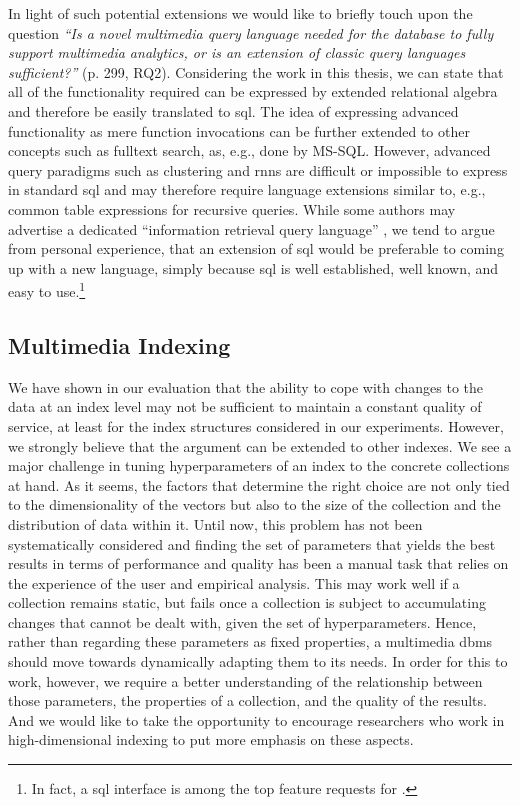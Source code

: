 In light of such potential extensions we would like to briefly touch upon the question  \emph{``Is a novel multimedia query language needed for the database to fully support multimedia analytics, or is an extension of classic query languages sufficient?''} \cite{Jonsson:2016Ten} (p. 299, RQ2). Considering the work in this thesis, we can state that all of the functionality required can be expressed by extended relational algebra and therefore be easily translated to \acrshort{sql}. The idea of expressing advanced functionality as mere function invocations can be further extended to other concepts such as fulltext search, as, e.g., done by MS-SQL. However, advanced query paradigms such as clustering and \acrshort{rnns} are difficult or impossible to express in standard \acrshort{sql} and may therefore require language extensions similar to, e.g., common table expressions for recursive queries. While some authors may advertise a dedicated ``information retrieval query language'' \cite{Ferro:2014Bridging}, we tend to argue from personal experience, that an extension of \acrshort{sql} would be preferable to coming up with a new language, simply because \acrshort{sql} is well established, well known, and easy to use.\footnote{In fact, a \acrshort{sql} interface is among the top feature requests for \cottontail{}.}

\subsection{Multimedia Indexing}

We have shown in our evaluation that the ability to cope with changes to the data at an index level may not be sufficient to maintain a constant quality of service, at least for the index structures considered in our experiments. However, we strongly believe that the argument can be extended to other indexes. We see a major challenge in tuning hyperparameters of an index to the concrete collections at hand. As it seems, the factors that determine the right choice are not only tied to the dimensionality of the vectors but also to the size of the collection and the distribution of data within it. Until now, this problem has not been systematically considered and finding the set of parameters that yields the best results in terms of performance and quality has been a manual task that relies on the experience of the user and empirical analysis. This may work well if a collection remains static, but fails once a collection is subject to accumulating changes that cannot be dealt with, given the set of hyperparameters. Hence, rather than regarding these parameters as fixed properties, a multimedia \acrshort{dbms} should move towards dynamically adapting them to its needs. In order for this to work, however, we require a better understanding of the relationship between those parameters, the properties of a collection, and the quality of the results. And we would like to take the opportunity to encourage researchers who work in high-dimensional indexing to put more emphasis on these aspects.

